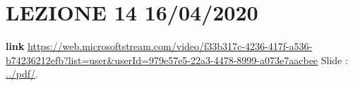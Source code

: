 \section*{LEZIONE 14 16/04/2020}
\textbf{link} \url{https://web.microsoftstream.com/video/f33b317c-4236-417f-a536-b74236212efb?list=user&userId=979e57e5-22a3-4478-8999-a073e7aacbee}\newline
\newline
Slide : \url{../pdf/}.